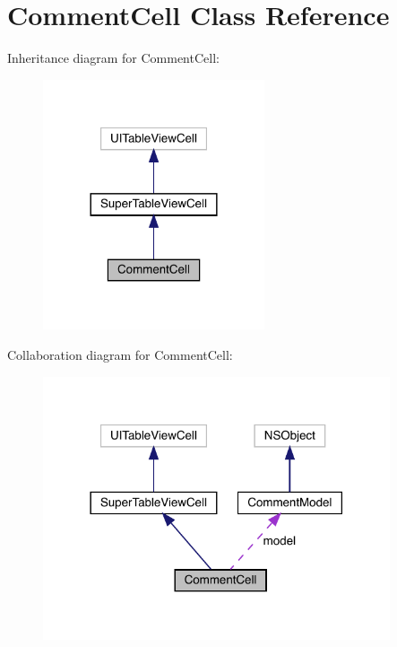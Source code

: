 \hypertarget{interface_comment_cell}{}\section{Comment\+Cell Class Reference}
\label{interface_comment_cell}


Inheritance diagram for Comment\+Cell\+:\nopagebreak
\begin{figure}[H]
\begin{center}
\leavevmode
\includegraphics[width=185pt]{interface_comment_cell__inherit__graph}
\end{center}
\end{figure}


Collaboration diagram for Comment\+Cell\+:\nopagebreak
\begin{figure}[H]
\begin{center}
\leavevmode
\includegraphics[width=290pt]{interface_comment_cell__coll__graph}
\end{center}
\end{figure}
